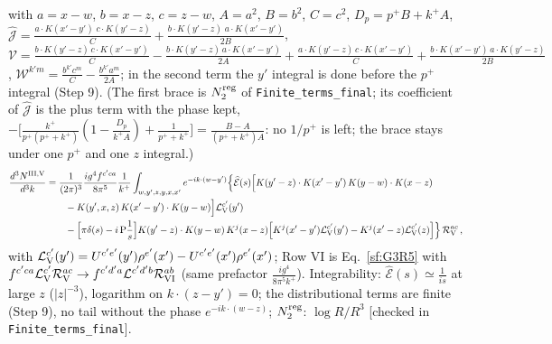 \documentclass[10pt]{article}
\begin{document}
with $a=x-w$, $b=x-z$, $c=z-w$, $A=a^{2}$, $B=b^{2}$, $C=c^{2}$, $D_{p}=p^{+}B+k^{+}A$, $\widehat{\mathcal{J}}=\frac{a\cdot K(x'-y')\;c\cdot K(y'-z)}{C}+\frac{b\cdot K(y'-z)\;a\cdot K(x'-y')}{2B}$, $\mathcal{V}=\frac{b\cdot K(y'-z)\,c\cdot K(x'-y')}{C}-\frac{b\cdot K(y'-z)\,a\cdot K(x'-y')}{2A}+\frac{a\cdot K(y'-z)\,c\cdot K(x'-y')}{C}+\frac{b\cdot K(x'-y')\,a\cdot K(y'-z)}{2B}$, $\mathcal{W}^{k'm}=\frac{b^{k'}c^{m}}{C}-\frac{b^{k'}a^{m}}{2A}$; in the second term the $y'$ integral is done before the $p^{+}$ integral (Step 9). (The first brace is $N_{2}^{\rm reg}$ of \texttt{Finite\_terms\_final}; its coefficient of $\widehat{\mathcal{J}}$ is the plus term with the phase kept, $-\big[\frac{k^{+}}{p^{+}(p^{+}+k^{+})}(1-\frac{D_{p}}{k^{+}A})+\frac{1}{p^{+}+k^{+}}\big]=\frac{B-A}{(p^{+}+k^{+})A}$: no $1/p^{+}$ is left; the brace stays under one $p^{+}$ and one $z$ integral.)
\begin{align}
\frac{d^{3}N^{\rm III,V}}{d^{3}k}&=\frac{1}{(2\pi)^{3}}\frac{ig^{4}f^{c'ca}}{8\pi^{5}}\frac{1}{k^{+}}\int_{w,y',z,y,x,x'}e^{-ik\cdot(w-y')}\Big\{\widehat{\mathcal{E}}(s)\Big[K(y'-z)\cdot K(x'-y')\,K(y-w)\cdot K(x-z)\notag\\&\qquad-K(y',x,z)\,K(x'-y')\cdot K(y-w)\Big]\mathcal{L}_{\rm V}^{c'}(y')\notag\\
&\qquad-\Big[\pi\delta(s)-i\,{\rm P}\frac1s\Big]K(y'-z)\cdot K(y-w)\,K^{j}(x-z)\Big[K^{j}(x'-y')\mathcal{L}_{\rm V}^{c'}(y')-K^{j}(x'-z)\mathcal{L}_{\rm V}^{c'}(z)\Big]\Big\}\,\mathcal{R}_{\rm V}^{ac}\,,\label{sf:G3R5}
\end{align}
with $\mathcal{L}_{\rm V}^{c'}(y')=U^{c'e'}(y')\rho^{e'}(x')-U^{c'e'}(x')\rho^{e'}(x')$; Row VI is Eq.~\eqref{sf:G3R5} with $f^{c'ca}\mathcal{L}_{\rm V}^{c'}\mathcal{R}^{ac}_{\rm V}\to f^{c'd'a}\mathcal{L}^{c'd'b}\mathcal{R}^{ab}_{\rm VI}$ (same prefactor $\frac{ig^{4}}{8\pi^{5}k^{+}}$). Integrability: $\widehat{\mathcal{E}}(s)\simeq\frac{1}{is}$ at large $z$ ($|z|^{-3}$), logarithm on $k\cdot(z-y')=0$; the distributional terms are finite (Step 9), no tail without the phase $e^{-ik\cdot(w-z)}$; $N_{2}^{\rm reg}$: $\log R/R^{3}$ [checked in \texttt{Finite\_terms\_final}].
\end{document}
